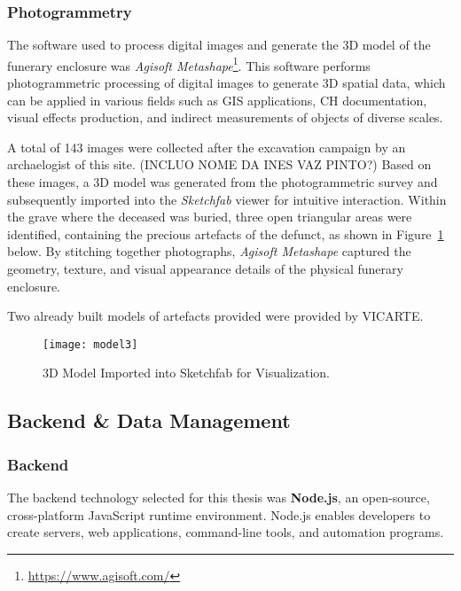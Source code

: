 \subsubsection{Photogrammetry}
\label{sec:photogrammetry_tool} 

The software used to process digital images and generate the \gls{3D} model of the funerary enclosure was \textit{Agisoft Metashape}\footnote{\url{https://www.agisoft.com/}}.
This software performs photogrammetric processing of digital images to generate \gls{3D} spatial data, which can be applied in various fields such as \gls{GIS} applications, \gls{CH} documentation, visual effects production, and indirect measurements of objects of diverse scales. 

 A total of 143 images were collected after the excavation campaign by an archaelogist of this site. (INCLUO NOME DA INES VAZ PINTO?)
Based on these images, a \gls{3D} model was generated from the photogrammetric survey and subsequently imported into the \textit{Sketchfab} viewer for intuitive interaction.
Within the grave where the deceased was buried, three open triangular areas were identified, containing the precious artefacts of the defunct, as shown in Figure~\ref{fig:model3} below.
By stitching together photographs, \textit{Agisoft Metashape} captured the geometry, texture, and visual appearance details of the physical funerary enclosure.

Two already built models of artefacts provided were provided by \gls{VICARTE}.

\begin{figure}[h!]
    \centering
    \texttt{[image: model3]}
    \caption{\gls{3D} Model Imported into Sketchfab for Visualization.}
    \label{fig:model3}
\end{figure}

\subsection{Backend \& Data Management}
\subsubsection{Backend}

The backend technology selected for this thesis was \textbf{Node.js}, an open-source, cross-platform JavaScript runtime environment. 
Node.js enables developers to create servers, web applications, command-line tools, and automation programs.

